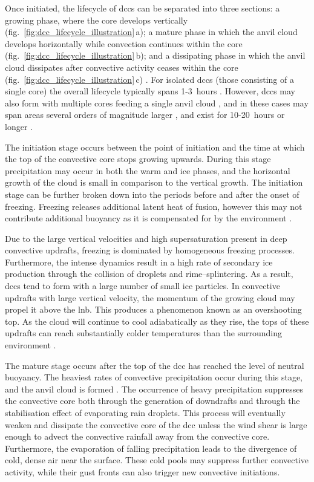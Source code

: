 Once initiated, the lifecycle of \acrshort{dcc}s can be separated into three sections: a growing phase, where the core develops vertically (fig.~\ref{fig:dcc_lifecycle_illustration}\,a); a mature phase in which the anvil cloud develops horizontally while convection continues within the core (fig.~\ref{fig:dcc_lifecycle_illustration}\,b); and a dissipating phase in which the anvil cloud dissipates after convective activity ceases within the core (fig.~\ref{fig:dcc_lifecycle_illustration}\,c) \citep{wall_life_2018}.
For isolated \acrshort{dcc}s (those consisting of a single core) the overall lifecycle typically spans 1-3~hours \citep{chen_diurnal_1997}.
However, \acrshort{dcc}s may also form with multiple cores feeding a single anvil cloud \citep{roca_simple_2017}, and in these cases may span areas several orders of magnitude larger \citep{houze_mesoscale_2004}, and exist for 10-20~hours or longer \citep{chen_diurnal_1997}.

The initiation stage occurs between the point of initiation and the time at which the top of the convective core stops growing upwards.
During this stage precipitation may occur in both the warm and ice phases, and the horizontal growth of the cloud is small in comparison to the vertical growth.
The initiation stage can be further broken down into the periods before and after the onset of freezing.
Freezing releases additional latent heat of fusion, however this may not contribute additional buoyancy as it is compensated for by the environment \citep{seeley_tropical_2016}.

Due to the large vertical velocities and high supersaturation present in deep convective updrafts, freezing is dominated by homogeneous freezing processes.
Furthermore, the intense dynamics result in a high rate of secondary ice production through the collision of droplets and rime--splintering.
As a result, \acrshort{dcc}s tend to form with a large number of small ice particles.
In convective updrafts with large vertical velocity, the momentum of the growing cloud may propel it above the \acrshort{lnb}.
This produces a phenomenon known as an overshooting top.
As the cloud will continue to cool adiabatically as they rise, the tops of these updrafts can reach substantially colder temperatures than the surrounding environment \citep{proud_recordlow_2021}.

The mature stage occurs after the top of the \acrshort{dcc} has reached the level of neutral buoyancy.
The heaviest rates of convective precipitation occur during this stage, and the anvil cloud is formed \citep{houze_chapter_2014}.
The occurrence of heavy precipitation suppresses the convective core both through the generation of downdrafts and through the stabilisation effect of evaporating rain droplets.
This process will eventually weaken and dissipate the convective core of the \acrshort{dcc} unless the wind shear is large enough to advect the convective rainfall away from the convective core.
Furthermore, the evaporation of falling precipitation leads to the divergence of cold, dense air near the surface.
These cold pools may suppress further convective activity, while their gust fronts can also trigger new convective initiations.

